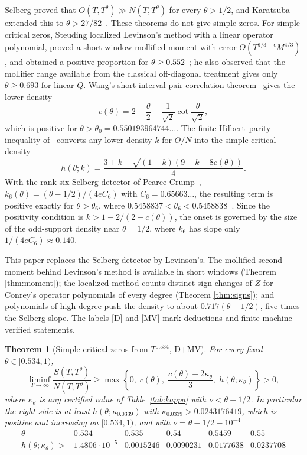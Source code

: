 \documentclass[11pt]{article}
\newtheorem{theorem}{Theorem}[section]
\theoremstyle{remark}
\begin{document}
Selberg proved that $O(T,T^\theta)\gg N(T,T^\theta)$ for every
$\theta>1/2$, and Karatsuba extended this to $\theta>27/82$~\cite{Karatsuba}.
These theorems do not give simple zeros. For simple critical zeros, Steuding
localized Levinson's method with a linear operator polynomial, proved a
short-window mollified moment with error $O(T^{1/3+\epsilon}M^{4/3})$, and
obtained a positive proportion for $\theta\ge0.552$~\cite{Steuding,SteudingThesis};
he also observed that the mollifier range available from the classical
off-diagonal treatment gives only $\theta\ge0.693$ for linear $Q$. Wang's short-interval
pair-correlation theorem~\cite{WangShort} gives the lower density
\begin{equation}\label{eq:wangc}
 c(\theta)=2-\frac\theta2-\frac1{\sqrt2}\cot\frac{\theta}{\sqrt2},
\end{equation}
which is positive for $\theta>\theta_0=0.550193964744\ldots$. The finite
Hilbert--parity inequality of~\cite[Proposition 2.5]{CAOSShort} converts any
lower density $k$ for $O/N$ into the simple-critical density
\begin{equation}\label{eq:h}
 h(\theta;k)=\frac{3+k-\sqrt{(1-k)(9-k-8c(\theta))}}4 .
\end{equation}
With the rank-six Selberg detector of Pearce-Crump~\cite{PearceCrump},
$k_6(\theta)=(\theta-1/2)/(4eC_6)$ with $C_6=0.65663\ldots$, the resulting
term is positive exactly for $\theta>\theta_6$, where
$0.5458837<\theta_6<0.5458838$~\cite[Theorem 1.2]{CAOSShort}. Since the
positivity condition is $k>1-2/(2-c(\theta))$, the onset is governed by the
size of the odd-support density near $\theta=1/2$, where $k_6$ has slope only
$1/(4eC_6)\approx0.140$.

This paper replaces the Selberg detector by Levinson's. The mollified second
moment behind Levinson's method is available in short windows (Theorem
\ref{thm:moment}); the localized method counts distinct sign changes of $Z$
for Conrey's operator polynomials of every degree (Theorem \ref{thm:signs});
and polynomials of high degree push the density to about $0.717(\theta-1/2)$,
five times the Selberg slope. The labels [D] and [MV] mark deductions and
finite machine-verified statements.

\begin{theorem}[Simple critical zeros from $T^{0.534}$, D+MV]
\label{thm:main}
For every fixed $\theta\in[0.534,1)$,
\begin{equation}\label{eq:main}
 \liminf_{T\to\infty}\frac{S(T,T^\theta)}{N(T,T^\theta)}
 \ge\max\left\{0,\;c(\theta),\;\frac{c(\theta)+2\kappa_\theta}3,\;
 h(\theta;\kappa_\theta)\right\}>0,
\end{equation}
where $\kappa_\theta$ is any certified value of Table~\ref{tab:kappa} with
$\nu<\theta-1/2$. In particular the right side is at least
$h(\theta;\kappa_{0.0339})$ with $\kappa_{0.0339}>0.0243176419$, which is
positive and increasing on $[0.534,1)$, and with $\nu=\theta-1/2-10^{-4}$
\[
\begin{array}{c|cccccc}
\theta&0.534&0.535&0.54&0.5459&0.55\\\hline
h(\theta;\kappa_\theta)>&1.4806\cdot10^{-5}&0.0015246&0.0090231&0.0177638&0.0237708
\end{array}
\]
\end{theorem}
\end{document}
